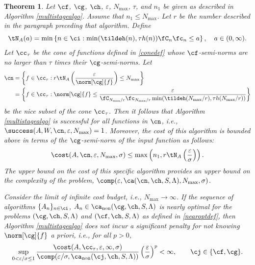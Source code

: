 \documentclass[]{elsarticle}
\DeclareMathOperator{\fix}{non}
\newtheorem{theorem}{Theorem}
\theoremstyle{definition}
\theoremstyle{remark}
\begin{document}
\begin{theorem}  \label{MultiStageThm}  Let  $\cf$, $\cg$, $\ch$, $\varepsilon$, $N_{\max}$, $\tau$, and $n_1$ be given as described in Algorithm \ref{multistagealgo}. Assume that $n_1 \le N_{\max}$. Let $r$ be the number described in the paragraph preceding that algorithm.  Define 
\[
\tN_A(a) = \min\left\{ n \in \ci : \min(\tildeh(n),\tau h(n))\fC_n\fc_n \le a \right\}, \quad a \in (0,\infty).
\]
Let $\cc_\tau$ be the cone of functions defined in \eqref{conedef} whose $\cf$-semi-norms are no larger than $\tau$ times their $\cg$-semi-norms.  Let
\begin{align} 
\nonumber
\cn &= \left \{ f \in \cc_\tau :r\tN_{A}\left(\frac{\varepsilon}{\norm[\cg]{f}} \right) \le N_{\max} \right\} \\
\label{nicefdefmulti}
&= \left \{ f \in \cc_\tau : \norm[\cg]{f} \le \frac{\varepsilon}{\fC_{N_{\max}/r} \fc_{N_{\max}/r} \min(\tildeh(N_{\max}/r),\tau h(N_{\max}/r))} \right\}
\end{align}
be the nice subset of the cone $\cc_\tau$.  Then it follows that Algorithm \ref{multistagealgo} is successful for all functions in $\cn$,  i.e.,  $\success(A,W,\cn,\varepsilon,N_{\max}) = 1$.  Moreover, the cost of this algorithm is bounded above in terms of the $\cg$-semi-norm of the input function as follows:
\begin{equation} \label{automultistagedetcost}
\cost(A,\cn,\varepsilon,N_{\max},\sigma)
\le \max \left(n_1, r\tN_{A}\left(\frac{\varepsilon}{\sigma} \right) \right).
\end{equation}
The upper bound on the cost of this specific algorithm provides an upper bound on the complexity of the problem, $\comp(\varepsilon,\ca(\cn,\ch,S,\Lambda),N_{\max},\sigma)$.  

Consider the limit of infinite cost budget, i.e., $N_{\max} \to \infty$.  If the sequence of algorithms $\{A_n\}_{n \in \ci}$, $A_n \in\ca_{\fix}(\cg,\ch,S,\Lambda)$  is nearly optimal for the problems $(\cg,\ch,S,\Lambda)$ and $(\cf,\ch,S,\Lambda)$ as defined in \eqref{nearoptdef}, then Algorithm \ref{multistagealgo} does not incur a significant penalty for not knowing $\norm[\cg]{f}$ a priori, i.e., for all $p>0$,
\begin{equation*} \label{multistagepenalty}
\sup_{0 < \varepsilon/\sigma \le 1} \frac{\cost(A,\cc_{\tau},\varepsilon,\infty,\sigma)} {\comp(\varepsilon/\sigma,\ca_{\fix}(\cj,\ch,S,\Lambda))} \left(\frac{\varepsilon}{\sigma}\right)^p <\infty, \qquad \cj \in \{\cf,\cg\}.
\end{equation*}
\end{theorem}
\end{document}
